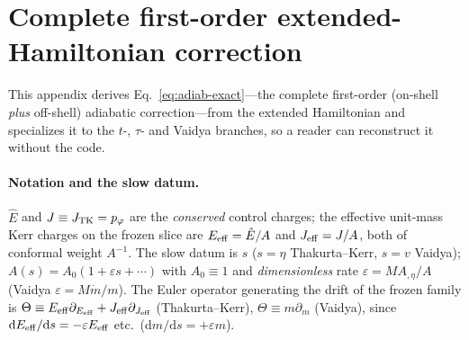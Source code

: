 \documentclass[
    aps, prd, twocolumn, superscriptaddress,
    showpacs, nofootinbib, floatfix
]{revtex4-2}
\newcommand{\Ehat}{\hat E}
\newcommand{\dd}{\mathrm{d}}
\begin{document}
\clearpage
\section{Complete first-order extended-Hamiltonian correction}
\label{app:firstorder}
This appendix derives Eq.~\eqref{eq:adiab-exact}---the complete first-order (on-shell
\emph{plus} off-shell) adiabatic correction---from the extended Hamiltonian and
specializes it to the $t$-, $\tau$- and Vaidya branches, so a reader can reconstruct
it without the code.

\paragraph{Notation and the slow datum.}
$\Ehat$ and $J\equiv J_{\rm TK}=p_\varphi$ are the \emph{conserved} control charges;
the effective unit-mass Kerr charges on the frozen slice are $E_{\rm eff}=\Ehat/A$ and
$J_{\rm eff}=J/A$, both of conformal weight $A^{-1}$. The slow datum is $s$ ($s=\eta$
Thakurta--Kerr, $s=v$ Vaidya); $A(s)=A_0(1+\varepsilon s+\cdots)$ with $A_0\equiv1$ and
\emph{dimensionless} rate $\varepsilon=M A_{,\eta}/A$ (Vaidya $\varepsilon=M\dot m/m$).
The Euler operator generating the drift of the frozen family is
$\Theta\equiv E_{\rm eff}\partial_{E_{\rm eff}}+J_{\rm eff}\partial_{J_{\rm eff}}$
(Thakurta--Kerr), $\Theta\equiv m\partial_m$ (Vaidya), since $\dd E_{\rm eff}/\dd
s=-\varepsilon E_{\rm eff}$ etc.\ ($\dd m/\dd s=+\varepsilon m$).
\end{document}
